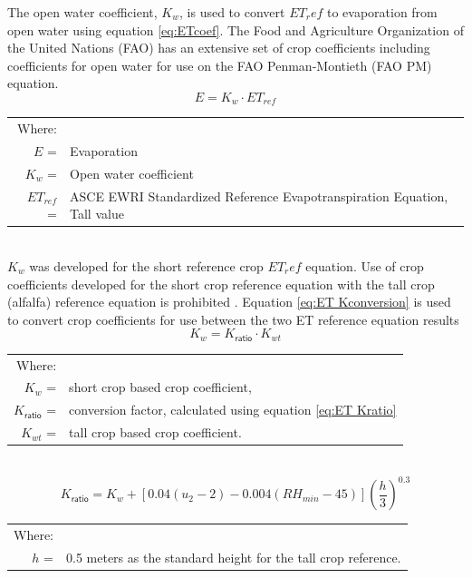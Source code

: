 \begin{linenumbers}
The open water coefficient, $K_w$, is used to convert $ET_ref$ to evaporation from open water using equation \ref{eq:ETcoef}.  The Food and Agriculture Organization of the United Nations (FAO) has an extensive set of crop coefficients including coefficients for open water for use on the FAO Penman-Montieth (FAO PM) equation.  
\begin{equation}
\label{eq:ETcoef}
E=K_w \cdot ET_{ref}
\end{equation}
\begin{tabular}{r l}
Where:&\\
$E$ = & Evaporation\\
$K_w$ = & Open water coefficient\\
$ET_{ref}$ = & ASCE EWRI Standardized Reference Evapotranspiration Equation, Tall value\\
\end{tabular}\\

$K_w$ was developed for the short reference crop $ET_ref$ equation.  Use of crop coefficients developed for the short crop reference equation with the tall crop (alfalfa) reference equation is prohibited  \parencite{FAO56, Allen2011}.  Equation \ref{eq:ET Kconversion} is used to convert crop coefficients for use between the two ET reference equation results \parencite{FAO56}
\begin{equation}
\label{eq:ET Kconversion}
	K_{w}=K_\mathsf{ratio} \cdot K_{wt}
\end{equation}
\begin{tabular}{r l}
Where:&\\
$K_{w}$ =& short crop based crop coefficient, \\
$K_\mathsf{ratio}$ =& conversion factor, calculated using equation \ref{eq:ET Kratio}\\
$K_{wt}$ =& tall crop based crop coefficient.\\
\end{tabular}\\

\begin{equation}
\label{eq:ET Kratio}
	K_\mathsf{ratio}=K_{w}+[0.04(u_2-2)-0.004(RH_{min}-45)] \left(\frac{h}{3} \right)^{0.3}
\end{equation}
\begin{tabular}{r l}
Where:&\\
$h$ =& 0.5 meters as the standard height for the tall crop reference.
\end{tabular}\\


\end{linenumbers}

